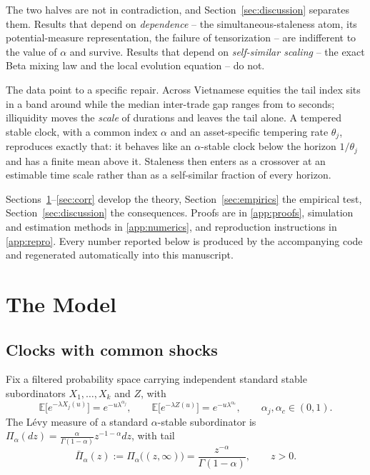 \documentclass{ws-ijtaf}
\newcommand{\E}{\mathbb{E}}
\begin{document}
The two halves are not in contradiction, and Section~\ref{sec:discussion}
separates them. Results that depend on \emph{dependence} -- the
simultaneous-staleness atom, its potential-measure representation, the failure
of tensorization -- are indifferent to the value of $\alpha$ and survive.
Results that depend on \emph{self-similar scaling} -- the exact Beta mixing law
and the local evolution equation -- do not.

The data point to a specific repair. Across Vietnamese equities the tail index
sits in a band around \hoseSecondMed{} while the median inter-trade gap ranges
from \hoseGapLo{} to \hoseGapHi{} seconds; illiquidity moves the \emph{scale} of
durations and leaves the tail alone. A tempered stable clock, with a common
index $\alpha$ and an asset-specific tempering rate $\theta_j$, reproduces
exactly that: it behaves like an $\alpha$-stable clock below the horizon
$1/\theta_j$ and has a finite mean above it. Staleness then enters as a
crossover at an estimable time scale rather than as a self-similar fraction of
every horizon.

Sections~\ref{sec:model}--\ref{sec:corr} develop the theory,
Section~\ref{sec:empirics} the empirical test, Section~\ref{sec:discussion} the
consequences. Proofs are in \ref{app:proofs}, simulation and estimation
methods in \ref{app:numerics}, and reproduction instructions in
\ref{app:repro}. Every number reported below is produced by the
accompanying code and regenerated automatically into this manuscript.

\section{The Model}\label{sec:model}

\subsection{Clocks with common shocks}

Fix a filtered probability space carrying independent standard stable
subordinators $X_1,\dots,X_k$ and $Z$, with
\begin{equation}
\E\big[e^{-\lambda X_j(u)}\big] = e^{-u\lambda^{\alpha_j}},
\qquad
\E\big[e^{-\lambda Z(u)}\big] = e^{-u\lambda^{\alpha_c}},
\qquad \alpha_j,\alpha_c\in(0,1).
\end{equation}
The L\'evy measure of a standard $\alpha$-stable subordinator is
$\Pi_\alpha(dz)=\frac{\alpha}{\Gamma(1-\alpha)}z^{-1-\alpha}dz$, with tail
\begin{equation}
\bar\Pi_\alpha(z) := \Pi_\alpha\big((z,\infty)\big)
= \frac{z^{-\alpha}}{\Gamma(1-\alpha)}, \qquad z>0.
\label{eq:levytail}
\end{equation}
\end{document}
